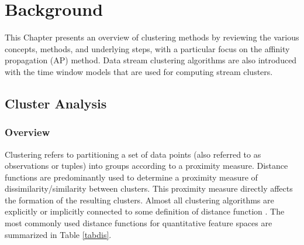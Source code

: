 \setlength{\parindent}{2em}
% 
\chapter{Background}


This Chapter presents an overview of clustering methods by reviewing the various concepts, methods, and underlying steps, with a particular focus on the affinity propagation (AP) method. Data stream clustering algorithms are also introduced with the time window models that are used for computing stream clusters. 





\section{Cluster Analysis}

\subsection{Overview}
Clustering refers to partitioning a set of data points (also referred to as observations or tuples) into groups according to a proximity measure. Distance functions are predominantly used to determine a proximity measure of dissimilarity/similarity between clusters.  This proximity measure directly affects the formation of the resulting clusters. Almost all clustering algorithms are explicitly or implicitly connected to some definition of distance function \cite{zumel2014practical}. The most commonly used distance functions for quantitative feature spaces are summarized in Table \ref{tabdis}. 





